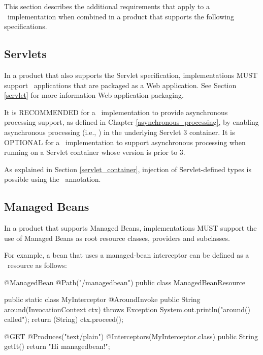 This section describes the additional requirements that apply to a \jaxrs\ implementation when combined in a product that supports the following specifications. 

\subsection{Servlets}
\label{servlets}

In a product that also supports the Servlet specification, implementations MUST support \jaxrs\ applications that are packaged as a Web application.
See Section \ref{servlet} for more information Web application packaging.

It is RECOMMENDED for a \jaxrs\ implementation to provide asynchronous processing support, as defined in Chapter \ref{asynchronous_processing}, by enabling asynchronous processing (i.e., ) in the underlying Servlet 3 container. It is OPTIONAL for a \jaxrs\ implementation to support asynchronous processing when running on a Servlet container whose version is prior to 3.

As explained in Section \ref{servlet_container}, injection of Servlet-defined types is possible using the \Context\ annotation.

\subsection{Managed Beans}
\label{managed_beans}

In a product that supports Managed Beans, implementations MUST support the use of Managed Beans as root resource classes, providers and  subclasses. 

For example, a bean that uses a managed-bean interceptor can be defined as a \jaxrs\ resource as follows:

\begin{listing}{1}
@ManagedBean
@Path("/managedbean")
public class ManagedBeanResource {

    public static class MyInterceptor {
        @AroundInvoke
        public String around(InvocationContext ctx) throws Exception {
            System.out.println("around() called");
            return (String) ctx.proceed();
        }
    }

    @GET
    @Produces("text/plain")
    @Interceptors(MyInterceptor.class)
    public String getIt() {
        return "Hi managedbean!";
    }
}
\end{listing}

